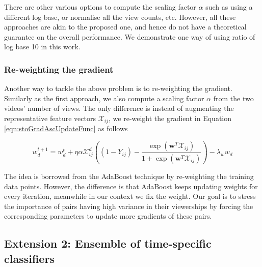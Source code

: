 There are other various options to compute the scaling factor $\alpha$ such as using a different log base, or normalise all the view counts, etc. However, all these approaches are akin to the proposed one, and hence do not have a theoretical guarantee on the overall performance. We demonstrate one way of using ratio of log base 10 in this work.

\subsubsection{Re-weighting the gradient}
Another way to tackle the above problem is to re-weighting the gradient. Similarly as the first approach, we also compute a scaling factor $\alpha$ from the two videos' number of views. The only difference is instead of augmenting the representative feature vectors $\mathcal{X}_{ij}$, we re-weight the gradient in Equation \ref{eqn:stoGradAscUpdateFunc} as follows

	\begin{equation}
	w^{t+1}_d = w^t_d + \eta \alpha \mathcal{X}_{ij}^d ( (1 - Y_{ij}) - \frac{\exp(\textbf{w}^T\mathcal{X}_{ij})}{1 + \exp(\textbf{w}^T\mathcal{X}_{ij})})  - \lambda_w w_d
	\label{eqn:stoGradAscUpdateFunc}
	\end{equation}

	The idea is borrowed from the AdaBoost technique by re-weighting the training data points. However, the difference is that AdaBoost keeps updating weights for every iteration, meanwhile in our context we fix the weight. Our goal is to stress the importance of pairs having high variance in their viewerships by forcing the corresponding parameters to update more gradients of these pairs. 
	 
\subsection{Extension 2: Ensemble of time-specific classifiers}
\label{subsec:ext2}

